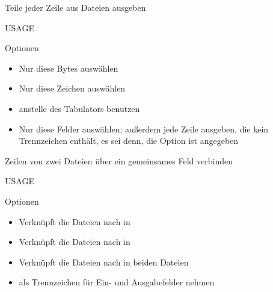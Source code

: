 \documentclass[aspectratio=43]{beamer}
\begin{document}
\begin{frame} 
	\begin{block}{} 
         Teile jeder Zeile aus Dateien ausgeben
	\end{block}
	\begin{block}{USAGE} 
	\end{block}
	\begin{exampleblock}{Optionen} 
	\begin{itemize}
	\item {} Nur diese Bytes auswählen
	\item {} Nur diese Zeichen auswählen
	\item {}\newline  {} anstelle des Tabulators  benutzen
	\item {} Nur  diese  Felder  auswählen; außerdem jede Zeile ausgeben, die kein Trennzeichen enthält,  es  sei  denn,  die  Option    ist angegeben
	\end{itemize}
	\end{exampleblock}
\end{frame}

\begin{frame} 
	\begin{block}{} 
        Zeilen von zwei Dateien über ein gemeinsames Feld verbinden
	\end{block}
	\begin{block}{USAGE} 
	\end{block}
	\begin{exampleblock}{Optionen} 
	\begin{itemize}
	\item {} Verknüpft die Dateien nach  in 
	\item {} Verknüpft die Dateien nach  in 
	\item {} \newline Verknüpft die Dateien nach  in beiden Dateien
	\item {}  \newline {} als Trennzeichen für Ein- und Ausgabefelder nehmen
	\end{itemize}
	\end{exampleblock}
\end{frame}
\end{document}
